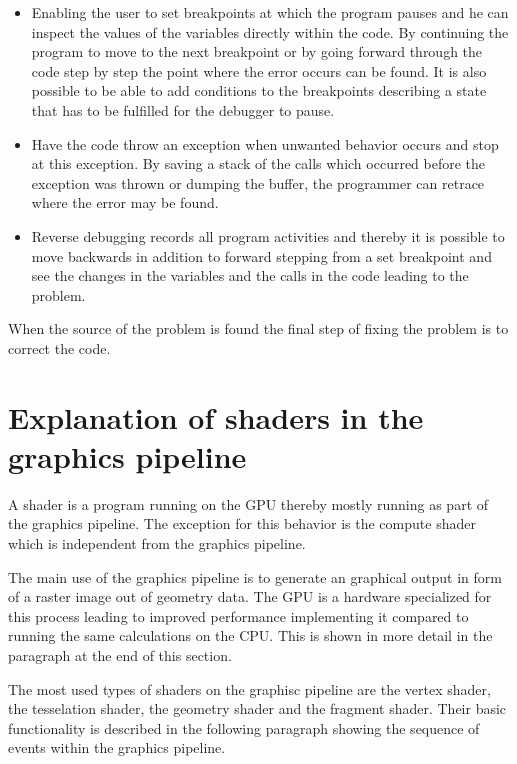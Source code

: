 \begin{itemize}

\item Enabling the user to set breakpoints at which the program pauses and he can inspect the values of the variables directly within the code. By continuing the program to move to the next breakpoint or by going forward through the code step by step the point where the error occurs can be found. It is also possible to be able to add conditions to the breakpoints describing a state that has to be fulfilled for the debugger to pause. 


\item Have the code throw an exception when unwanted behavior occurs and stop at this exception. By saving a stack of the calls which occurred before the exception was thrown or dumping the buffer, the programmer can retrace where the error may be found.


\item Reverse debugging records all program activities and thereby it is possible to move backwards in addition to forward stepping from a set breakpoint and see the changes in the variables and the calls in the code leading to the problem.

\end{itemize}

When the source of the problem is found the final step of fixing the problem is to correct the code.

\section{Explanation of shaders in the graphics pipeline}

A shader is a program running on the GPU thereby mostly running as part of the graphics pipeline. The exception for this behavior is the compute shader which is independent from the graphics pipeline.

The main use of the graphics pipeline is to generate an graphical output in form of a raster image out of geometry data. The GPU is a hardware specialized for this process leading to improved performance implementing it compared to running the same calculations on the CPU. This is shown in more detail in the paragraph at the end of this section.

The most used types of shaders on the graphisc pipeline are the vertex shader, the tesselation shader, the geometry shader and the fragment shader. Their basic functionality is described in the following paragraph showing the sequence of events within the graphics pipeline.

